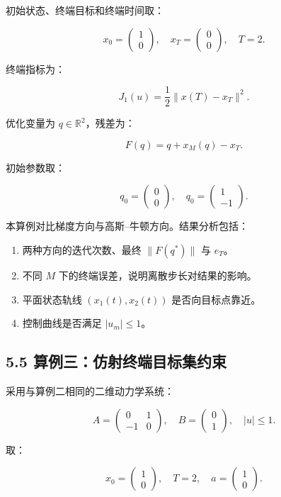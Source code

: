 \documentclass[UTF8,a4paper,zihao=-4]{ctexart}
\begin{document}
初始状态、终端目标和终端时间取：

\[
x_0=
\begin{pmatrix}
1\\
0
\end{pmatrix},
\quad
x_T=
\begin{pmatrix}
0\\
0
\end{pmatrix},
\quad
T=2.
\]

终端指标为：

\[
J_1(u)=\frac{1}{2}\|x(T)-x_T\|^2.
\]

优化变量为 $q\in\mathbb{R}^2$，残差为：

\[
F(q)=q+x_M(q)-x_T.
\]

初始参数取：

\[
q_0=
\begin{pmatrix}
0\\
0
\end{pmatrix},
\quad
q_0=
\begin{pmatrix}
1\\
-1
\end{pmatrix}.
\]

本算例对比梯度方向与高斯--牛顿方向。结果分析包括：

\begin{enumerate}
\item 两种方向的迭代次数、最终 $\|F(q^*)\|$ 与 $e_T$。
\item 不同 $M$ 下的终端误差，说明离散步长对结果的影响。
\item 平面状态轨线 $(x_1(t),x_2(t))$ 是否向目标点靠近。
\item 控制曲线是否满足 $|u_m|\leq 1$。
\end{enumerate}

\subsection{5.5 算例三：仿射终端目标集约束}

采用与算例二相同的二维动力学系统：

\[
A=
\begin{pmatrix}
0&1\\
-1&0
\end{pmatrix},
\quad
B=
\begin{pmatrix}
0\\
1
\end{pmatrix},
\quad |u|\leq 1.
\]

取：

\[
x_0=
\begin{pmatrix}
1\\
0
\end{pmatrix},
\quad
T=2,
\quad
a=
\begin{pmatrix}
1\\
0
\end{pmatrix}.
\]
\end{document}
